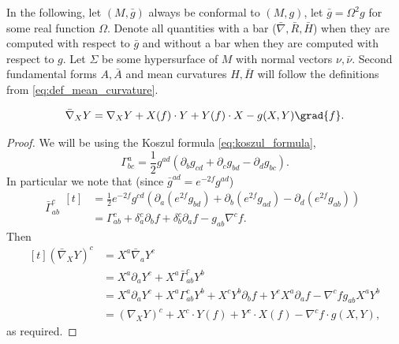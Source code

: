 \documentclass[titlepage,numbers=noenddot,oneside,%
cleardoublepage=empty,paper=a4,fontsize=11pt,%
english,%
]{scrartcl}
\begin{document}
In the following, let \( (M,\bar{g}) \) always be conformal to \( (M,g) \), \ie let \( \bar{g}=\Omega^2 g \) for some real function \( \Omega \). Denote all quantities with a bar (\eg \( \bar{\nabla},\bar{R},\bar{H} \)) when they are computed with respect to \( \bar{g} \) and without a bar when they are computed with respect to \( g \). Let \( \Sigma \) be some hypersurface of \( M \) with normal vectors \( \nu,\bar{\nu} \). Second fundamental forms \( A,\bar{A} \) and mean curvatures \( H,\bar{H} \) will follow the definitions from \cref{eq:def_mean_curvature}.

\begin{lemma}\label{lem:conformal_change_connection}
    \begin{equation*}
        \bar{\nabla}_X Y =\nabla_X Y+X(f)\cdot Y+Y(f)\cdot X-g(X,Y)\grad{f}.
    \end{equation*}
\end{lemma}
\begin{proof}
    We will be using the Koszul formula \cref{eq:koszul_formula},
    \begin{equation*}
        \Gamma^a_{bc}=\frac{1}{2}g^{ad}(\partial_b g_{cd}+\partial_c g_{bd}-\partial_d g_{bc}).
    \end{equation*}
    In particular we note that (since \( \bar{g}^{ad}=e^{-2f}g^{ad} \))
    \begin{equation*}
        \bar{\Gamma}^c_{ab}\begin{aligned}[t]
            &=\frac{1}{2}e^{-2f}g^{cd}(\partial_a(e^{2f}g_{bd})+\partial_b(e^{2f}g_{ad})-\partial_d(e^{2f}g_{ab}))\\
            &=\Gamma^c_{ab}+\delta^c_a\partial_b f +\delta^c_b\partial_a f-g_{ab}\nabla^c f.
        \end{aligned}
    \end{equation*}
    Then
    \begin{equation*}
        \begin{aligned}[t]
            (\bar{\nabla}_X Y)^c&=X^a \bar{\nabla}_a Y^c\\
            &=X^a \partial_a Y^c + X^a\bar{\Gamma}_{ab}^c  Y^b\\
            &=X^a \partial_a Y^c +X^a \Gamma_{ab}^c Y^b+X^c Y^b \partial_b f+ Y^c X^a \partial_a f-\nabla^c f g_{ab}X^a Y^b\\
            &=(\nabla_X Y)^c+X^c\cdot Y(f)+Y^c\cdot X(f)-\nabla^c f \cdot g(X,Y),
        \end{aligned}
    \end{equation*}
    as required.
\end{proof}
\end{document}
